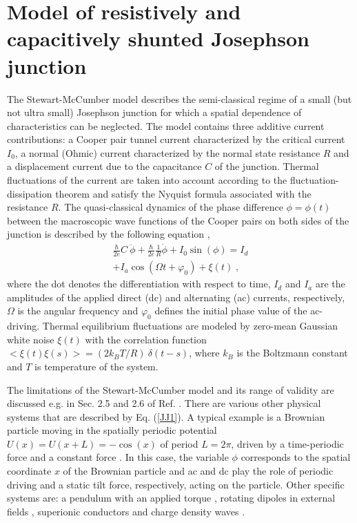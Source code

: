 \documentclass{physeauth}
\begin{document}
\section{Model of  resistively and capacitively shunted Josephson
  junction}

The Stewart-McCumber model describes the
semi-classical regime of a small (but not ultra small) Josephson
junction for which a spatial dependence of characteristics can be
neglected. The model contains three additive current contributions:
a Cooper pair tunnel current characterized by the critical current
$I_0$, a normal (Ohmic) current characterized by the normal state
resistance $R$ and a displacement current due to the capacitance $C$ of
the junction. Thermal fluctuations of the current are taken into
account according to the fluctuation-dissipation theorem and satisfy the Nyquist
formula associated with the resistance $R$. The quasi-classical
dynamics of the phase difference $\phi=\phi(t)$ between the
macroscopic wave functions of the Cooper pairs on both sides of
the junction is described by the following equation
\cite{barone,kautz},
%
\begin{eqnarray} \label{JJ1}
\frac{\hbar}{2e}  C\:\ddot{\phi} +  \frac{\hbar}{2e}  \frac{1}{R} \dot{\phi}
+  I_0 \sin (\phi) =  I_d  \nonumber\\
+ I_a \cos(\Omega t+\varphi_0) + \xi (t)\;, 
\end{eqnarray}
%
where the dot denotes the differentiation with respect to time, $I_d$ and
$I_a$ are the amplitudes of the applied direct (dc) and alternating (ac) 
currents,
respectively, $\Omega$ is the angular frequency and $\varphi_0$
defines the initial phase value of the ac-driving.  
Thermal equilibrium fluctuations are modeled by zero-mean 
Gaussian white noise $\xi(t)$ with   the correlation function  
$<\xi(t) \xi(s)> = (2 k_B T/R) \:\delta(t-s)$,  where  
$k_B$ is the Boltzmann constant and $T$ is  temperature of the
system. 

The limitations of the Stewart-McCumber model and its range of
validity are discussed e.g. in Sec. 2.5 and 2.6 of Ref.  \cite{kautz}.
There are various other physical systems that are described by
Eq. (\ref{JJ1}).  A typical example is a Brownian particle moving in the
spatially periodic potential $U(x)=U(x+L)= - \cos(x)$ of period $L=
2\pi$, driven by a time-periodic force and a constant force
\cite{machuraJPC}.  In this case, the variable $\phi$ corresponds to the spatial
coordinate $x$ of the Brownian particle and ac and dc
play the role of periodic driving and a static tilt force,
respectively, acting on the particle. Other specific
systems are: a pendulum with an applied torque \cite{barone}, rotating
dipoles in external fields \cite{Reg2000,Coffey}, superionic
conductors \cite{Ful1975} and charge density waves \cite{Gru1981}.
\end{document}

